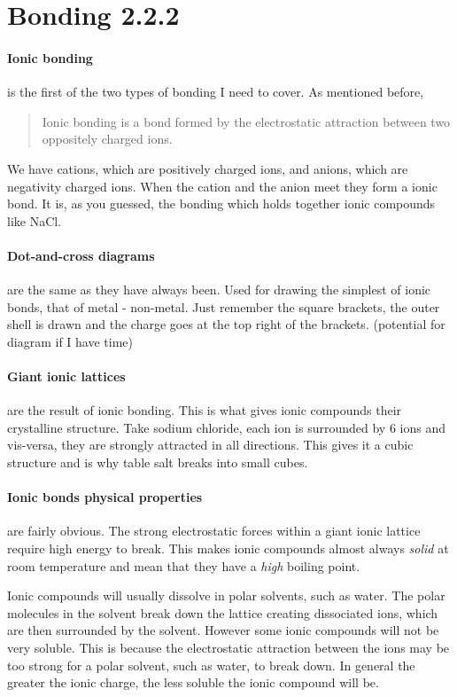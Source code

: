 \documentclass[11pt,a4paper]{memoir}
\begin{document}
\section{Bonding 2.2.2}

	\paragraph{Ionic bonding} is the first of the two types of bonding I need to cover. As mentioned before,
	\begin{quote}
		Ionic bonding is a bond formed by the electrostatic attraction between two oppositely charged ions.
	\end{quote}
	We have cations, which are positively charged ions, and anions, which are negativity charged ions. When the cation and the anion meet they form a ionic bond. It is, as you guessed, the bonding which holds together ionic compounds like NaCl.
	 
	\paragraph{Dot-and-cross diagrams} are the same as they have always been. Used for drawing the simplest of ionic bonds, that of metal - non-metal. Just remember the square brackets, the outer shell is drawn and the charge goes at the top right of the brackets. (potential for diagram if I have time)
	 
	\paragraph{Giant ionic lattices} are the result of ionic bonding. This is what gives ionic compounds their crystalline structure. Take sodium chloride, each  ion is surrounded by 6  ions and vis-versa, they are strongly attracted in all directions. This gives it a cubic structure and is why table salt breaks into small cubes. 
	 
	\paragraph{Ionic bonds physical properties} are fairly obvious. The strong electrostatic forces within a giant ionic lattice require high energy to break. This makes ionic compounds almost always \textit{solid} at room temperature and mean that they have a \textit{high} boiling point.
	 
	Ionic compounds will usually dissolve in polar solvents, such as water. The polar molecules in the solvent break down the lattice creating dissociated ions, which are then surrounded by the solvent. However some ionic compounds will not be very soluble. This is because the electrostatic attraction between the ions may be too strong for a polar solvent, such as water, to break down. In general the greater the ionic charge, the less soluble the ionic compound will be.
	 
\end{document}
